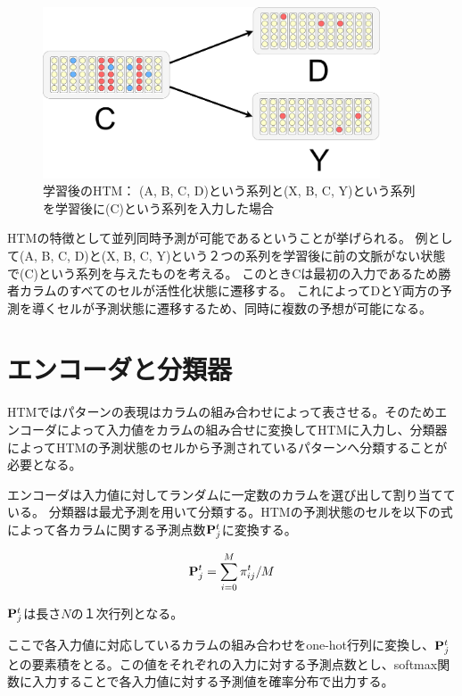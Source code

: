 \begin{figure}[ht]
  \begin{center}
    \includegraphics[width=10cm]{./fig/drawing_8}
    \caption{学習後のHTM： (A, B, C, D)という系列と(X, B, C, Y)という系列を学習後に(C)という系列を入力した場合}
    \label{fig:HTM_parallel_prediction}
  \end{center}
\end{figure}

HTMの特徴として並列同時予測が可能であるということが挙げられる。
例として(A, B, C, D)と(X, B, C, Y)という２つの系列を学習後に前の文脈がない状態で(C)という系列を与えたものを考える。
このときCは最初の入力であるため勝者カラムのすべてのセルが活性化状態に遷移する。
これによってDとY両方の予測を導くセルが予測状態に遷移するため、同時に複数の予想が可能になる。

\newpage
\section{エンコーダと分類器}
HTMではパターンの表現はカラムの組み合わせによって表させる。そのためエンコーダによって入力値をカラムの組み合せに変換してHTMに入力し、分類器によってHTMの予測状態のセルから予測されているパターンへ分類することが必要となる。

エンコーダは入力値に対してランダムに一定数のカラムを選び出して割り当てている。
分類器は最尤予測を用いて分類する。HTMの予測状態のセルを以下の式によって各カラムに関する予測点数${\bf P}^t_j$に変換する。

\begin{equation}
  {\bf P}^t_j = \sum^{M}_{i=0} \pi^t_{ij} / M
\end{equation}

${\bf P}^t_j$は長さ$N$の１次行列となる。

ここで各入力値に対応しているカラムの組み合わせをone-hot行列に変換し、${\bf P}^t_j$との要素積をとる。この値をそれぞれの入力に対する予測点数とし、softmax関数に入力することで各入力値に対する予測値を確率分布で出力する。

